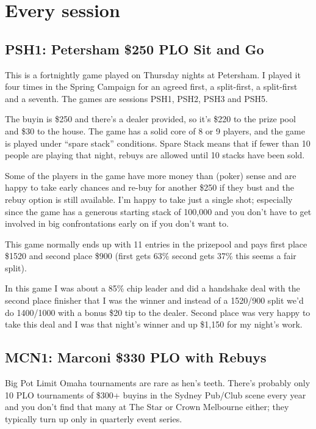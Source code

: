 \chapter{Every session}

\section*{PSH1: Petersham \$250 PLO Sit and Go}

This is a fortnightly game played on Thursday nights at Petersham.
I played it four times in the Spring Campaign for an agreed first,
a split-first, a split-first and a seventh. The games are sessions
PSH1, PSH2, PSH3 and PSH5.

The buyin is \$250 and there's a dealer provided, so it's \$220 to
the prize pool and \$30 to the house. The game has a solid core of
8 or 9 players, and the game is played under ``spare stack''
conditions. Spare Stack means that if fewer than 10 people are playing
that night, rebuys are allowed until 10 stacks have been sold.

Some of the players in the game have more money than (poker) sense and
are happy to take early chances and re-buy for another \$250 if they
bust and the rebuy option is still available. I'm happy to take just a
single shot; especially since the game has a generous starting stack
of 100,000 and you don't have to get involved in big confrontations
early on if you don't want to.

This game normally ends up with 11 entries in the prizepool and pays
first place \$1520 and second place \$900 (first gets 63\% second gets
37\% this seems a fair split).

In this game I was about a 85\% chip leader and did a handshake deal
with the second place finisher that I was the winner and instead of a
1520/900 split we'd do 1400/1000 with a bonus \$20 tip to the
dealer. Second place was very happy to take this deal and I was that
night's winner and up \$1,150 for my night's work.

\section*{MCN1: Marconi \$330 PLO with Rebuys}

Big Pot Limit Omaha tournaments are rare as hen's teeth. There's
probably only 10 PLO tournaments of \$300+ buyins in the Sydney
Pub/Club scene every year and you don't find that many at The Star or
Crown Melbourne either; they typically turn up only in quarterly event
series.

